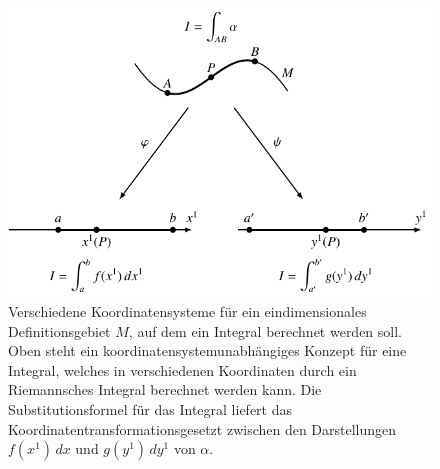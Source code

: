 %
%
%
\begin{figure}
\centering
\includegraphics{chapters/030-kurvenintegral/images/1koordinaten.pdf}
\caption{Verschiedene Koordinatensysteme für ein eindimensionales
Definitionsgebiet $M$, auf dem ein Integral berechnet werden soll.
Oben steht ein koordinatensystemunabhängiges Konzept für eine Integral, 
welches in verschiedenen Koordinaten durch ein Riemannsches Integral
berechnet werden kann.
Die Substitutionsformel für das Integral liefert das
Koordinatentransformationsgesetzt zwischen den Darstellungen
$f(x^1)\,dx$ und $g(y^1)\,dy^1$ von $\alpha$.
\label{buch:kurvenintegral:fig:1koordinaten}}
\end{figure}
